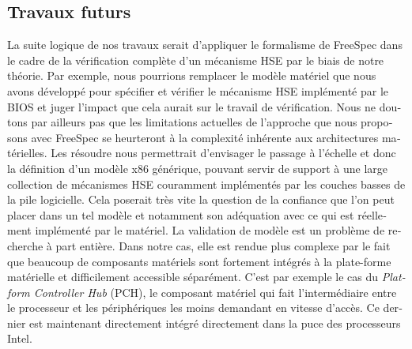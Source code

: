 \begin{otherlanguage}{french}
  \subsection*{Travaux futurs}
  La suite logique de nos travaux serait d’appliquer le formalisme de FreeSpec
  dans le cadre de la vérification complète d’un mécanisme HSE par le biais de
  notre théorie.
  Par exemple, nous pourrions remplacer le modèle matériel que nous avons
  développé pour spécifier et vérifier le mécanisme HSE implémenté par le BIOS
  et juger l’impact que cela aurait sur le travail de vérification.
  Nous ne doutons par ailleurs pas que les limitations actuelles de l’approche
  que nous proposons avec FreeSpec se heurteront à la
  complexité inhérente aux architectures matérielles.
  Les résoudre nous permettrait d’envisager le passage à l’échelle et donc la
  définition d’un modèle x86 générique, pouvant servir de support à une large
  collection de mécanismes HSE couramment implémentés par les couches basses de
  la pile logicielle.
  Cela poserait très vite la question de la confiance que l’on peut placer dans
  un tel modèle et notamment son adéquation avec ce qui est réellement
  implémenté par le matériel.
  La validation de modèle est un problème de recherche à part entière.
  Dans notre cas, elle est rendue plus complexe par le fait que beaucoup de
  composants matériels sont fortement intégrés à la plate-forme matérielle et
  difficilement accessible séparément.
  C'est par exemple le cas du \emph{Platform Controller Hub} (PCH), le composant
  matériel qui fait l’intermédiaire entre le processeur et les périphériques les
  moins demandant en vitesse d’accès.
  Ce dernier est maintenant directement intégré directement dans la puce des
  processeurs Intel.
\end{otherlanguage}
